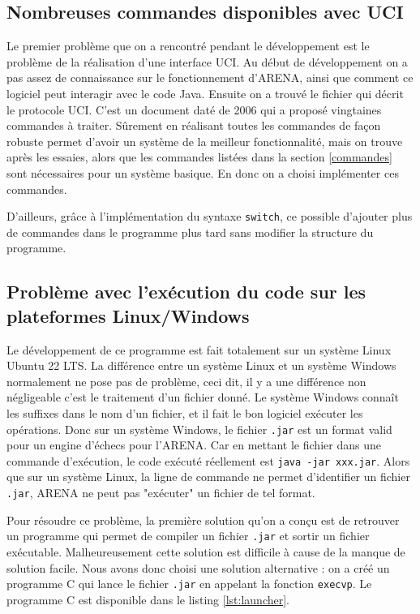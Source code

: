 \documentclass{article}
\begin{document}
\subsection{Nombreuses commandes disponibles avec UCI}
\par Le premier problème que on a rencontré pendant le développement est le problème de la réalisation d'une interface UCI. Au début de développement on a pas assez de connaissance sur le fonctionnement d'ARENA, ainsi que comment ce logiciel peut interagir avec le code Java. Ensuite on a trouvé le fichier qui décrit le protocole UCI\cite{doc:uci}. C'est un document daté de 2006 qui a proposé vingtaines commandes à traiter. Sûrement en réalisant toutes les commandes de façon robuste permet d'avoir un système de la meilleur fonctionnalité, mais on trouve après les essaies, alors que les commandes listées dans la section \ref{commandes} sont nécessaires pour un système basique. En donc on a choisi implémenter ces commandes.

\par D'ailleurs, grâce à l'implémentation du syntaxe \texttt{switch}, ce possible d'ajouter plus de commandes dans le programme plus tard sans modifier la structure du programme. 

\subsection{Problème avec l'exécution du code sur les plateformes Linux/Windows}
\par Le développement de ce programme est fait totalement sur un système Linux Ubuntu 22 LTS. La différence entre un système Linux et un système Windows normalement ne pose pas de problème, ceci dit, il y a une différence non négligeable c'est le traitement d'un fichier donné. Le système Windows connaît les suffixes dans le nom d'un fichier, et il fait le bon logiciel exécuter les opérations. Donc sur un système Windows, le fichier \texttt{.jar} est un format valid pour un engine d'échecs pour l'ARENA. Car en mettant le fichier dans une commande d'exécution, le code exécuté réellement est \texttt{java -jar xxx.jar}. Alors que sur un système Linux, la ligne de commande ne permet d'identifier un fichier \texttt{.jar}, ARENA ne peut pas "exécuter" un fichier de tel format.

\par Pour résoudre ce problème, la première solution qu'on a conçu est de retrouver un programme qui permet de compiler un fichier \texttt{.jar} et sortir un fichier exécutable. Malheureusement cette solution est difficile à cause de la manque de solution facile. Nous avons donc choisi une solution alternative : on a créé un programme C qui lance le fichier \texttt{.jar} en appelant la fonction \texttt{execvp}\cite{doc:evecvp}. Le programme C est disponible dans le listing \ref{lst:launcher}.
\end{document}
